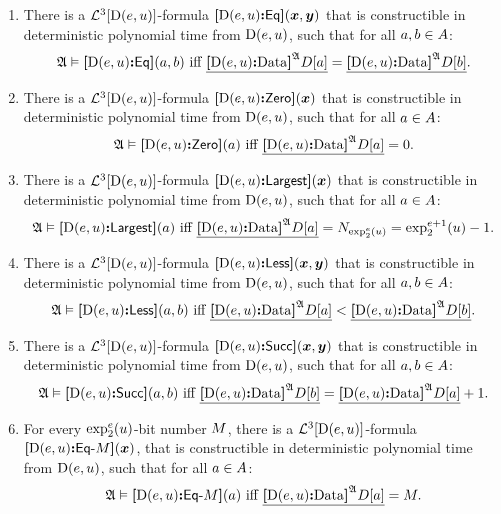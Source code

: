 \begin{definition}
\begin{enumerate}[label=E\arabic*]
  \item\label{eset:3} There is a $\mathcal{L}^{3}[{\mathrm{D}}(e,u)]$-formula
  ${\bm{[}{\mathrm{D}}(e,u)\mathord{\bm{:}}\mathsf{Eq}\bm{]}}(\bm{x},\bm{y})$ that is constructible in deterministic
  polynomial time from ${\mathrm{D}}(e,u)$, such that for all $a,b \in A$:
  \[
    \miff{
      \StrA \vDash \fEq{\DS(\sze,\szu)}(\ea,\eb)}{
      \bdec{\Data{\DS(\sze,\szu)}\StrA\relD[\ea]} =
      \bdec{\Data{\DS(\sze,\szu)}\StrA\relD[\eb]}}.
  \]
  \item\label{eset:4} There is a $\mathcal{L}^{3}[{\mathrm{D}}(e,u)]$-formula
  ${\bm{[}{\mathrm{D}}(e,u)\mathord{\bm{:}}\mathsf{Zero}\bm{]}}(\bm{x})$ that is constructible in deterministic
  polynomial time from ${\mathrm{D}}(e,u)$, such that for all $a \in A$:
  \[
    \miff{
      \StrA \vDash \fZero{\DS(\sze,\szu)}(\ea)}{
      \bdec{\Data{\DS(\sze,\szu)}\StrA\relD[\ea]} = 0}.
  \]
  \item\label{eset:5} There is a $\mathcal{L}^{3}[{\mathrm{D}}(e,u)]$-formula
  ${\bm{[}{\mathrm{D}}(e,u)\mathord{\bm{:}}\mathsf{Largest}\bm{]}}(\bm{x})$ that is constructible in deterministic
  polynomial time from ${\mathrm{D}}(e,u)$, such that for all $a \in A$:
  \[
    \miff{
      \StrA \vDash \fLargest{\DS(\sze,\szu)}(\ea)}{
      \bdec{\Data{\DS(\sze,\szu)}\StrA\relD[\ea]} = \largtbit{\tetr\sze2\szu} =
      \tetr{\sze+1}2\szu-1}.
  \]
  \item\label{eset:6} There is a $\mathcal{L}^{3}[{\mathrm{D}}(e,u)]$-formula
  ${\bm{[}{\mathrm{D}}(e,u)\mathord{\bm{:}}\mathsf{Less}\bm{]}}(\bm{x},\bm{y})$ that is constructible in deterministic
  polynomial time from ${\mathrm{D}}(e,u)$,
  such that for all $a, b \in A$:
  \[
    \miff{
      \StrA \vDash \fLess{\DS(\sze,\szu)}(\ea,\eb)}{
      \bdec{\Data{\DS(\sze,\szu)}\StrA\relD[\ea]} <
      \bdec{\Data{\DS(\sze,\szu)}\StrA\relD[\eb]}}.
  \]
  \item\label{eset:7} There is a $\mathcal{L}^{3}[{\mathrm{D}}(e,u)]$-formula
  ${\bm{[}{\mathrm{D}}(e,u)\mathord{\bm{:}}\mathsf{Succ}\bm{]}}(\bm{x},\bm{y})$ that is constructible in deterministic
  polynomial time from ${\mathrm{D}}(e,u)$, such that for all $a, b \in A$:
  \[
    \miff{
      \StrA \vDash \fSucc{\DS(\sze,\szu)}(\ea,\eb)}{
      \bdec{\Data{\DS(\sze,\szu)}\StrA\relD[\eb]} =
      \bdec{\Data{\DS(\sze,\szu)}\StrA\relD[\ea]} + 1}.
  \]
  \item\label{eset:8} For every $\exp_{2}^{e}(u)$-bit number $M$, there is a
  $\mathcal{L}^{3}[{\mathrm{D}}(e,u)]$-formula
  ${\bm{[}{\mathrm{D}}(e,u)\mathord{\bm{:}}\mathsf{Eq}{\hbox{-}}M\bm{]}}(\bm{x})$, that is constructible in deterministic
  polynomial time from ${\mathrm{D}}(e,u)$,
  such that for all $a \in  A$:
  \[
    \miff{
      \StrA \vDash \fDataA{\DS(\sze,\szu)}\nM(\ea)}{
      \bdec{\Data{\DS(\sze,\szu)}\StrA\relD[\ea]} = \nM}.
  \]
\end{enumerate}
\end{definition}
